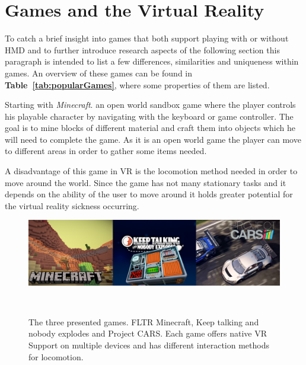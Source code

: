 
\section{Games and the Virtual Reality}
\label{sec:gamesNvr}

To catch a brief insight into games that both support playing with or without HMD and to further introduce research aspects of the following section this paragraph is intended to list a few differences, similarities and uniqueness within games. An overview of these games can be found in \textbf{Table~\ref{tab:popularGames}}, where some properties of them are listed. 

Starting with \textit{Minecraft}. an open world sandbox game where the player controls his playable character by navigating with the keyboard or game controller. The goal is to mine blocks of different material and craft them into objects which he will need to complete the game. As it is an open world game the player can move to different areas in order to gather some items needed. 

A disadvantage of this game in VR is the locomotion method needed in order to move around the world. Since the game has not many stationary tasks and it depends on the ability of the user to move around it holds greater potential for the virtual reality sickness occurring.

\begin{figure}
	\centering
	\includegraphics[width=0.99\columnwidth]{./figures/banner}
	\caption[banner]{The three presented games. FLTR Minecraft, Keep talking and nobody explodes and Project CARS. Each game offers native VR Support on multiple devices and has different interaction methods for locomotion.\footnotemark}~\label{fig:banner}
\end{figure}

